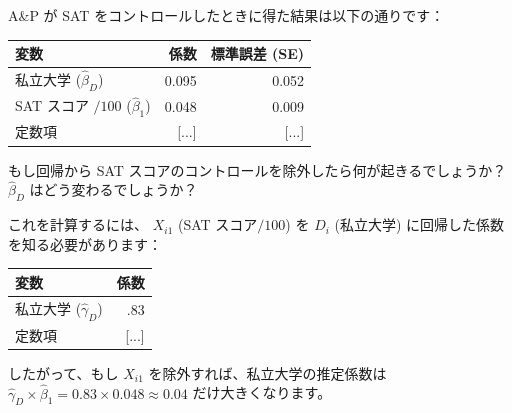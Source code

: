 \documentclass[11pt,handout]{beamer}
\newenvironment{wideitemize}{\itemize\addtolength{\itemsep}{10pt}}{\enditemize}
\begin{document}
\begin{frame}
	\begin{wideitemize}
		\item
		A\&P が SAT をコントロールしたときに得た結果は以下の通りです： \\
		\begin{tabular}{lrr}
			変数 & 係数 & 標準誤差 (SE) \\ \hline
			私立大学 ($\hat\beta_D$) & 0.095 & 0.052 \\
			SAT スコア $/ 100$ ($\hat\beta_1$) & 0.048 & 0.009 \\
			定数項 & [...] & [...]
		\end{tabular}
		
		\item
		もし回帰から SAT スコアのコントロールを除外したら何が起きるでしょうか？ $\hat\beta_D$ はどう変わるでしょうか？
		
		\pause
		\item
		これを計算するには、 $X_{i1}$ (SAT スコア$/100$) を $D_i$ (私立大学) に回帰した係数を知る必要があります： \\
		\pause
		\begin{tabular}{lr}
			変数 & 係数 \\ \hline
			私立大学 ($\hat\gamma_D$) & .83 \\
			定数項 & [...]
		\end{tabular}
		
		\pause
		\item 
		したがって、もし $X_{i1}$ を除外すれば、私立大学の推定係数は $\hat\gamma_D \times \hat\beta_1 = 0.83 \times 0.048 \approx 0.04$ だけ大きくなります。
	\end{wideitemize}
\end{frame}
\end{document}

